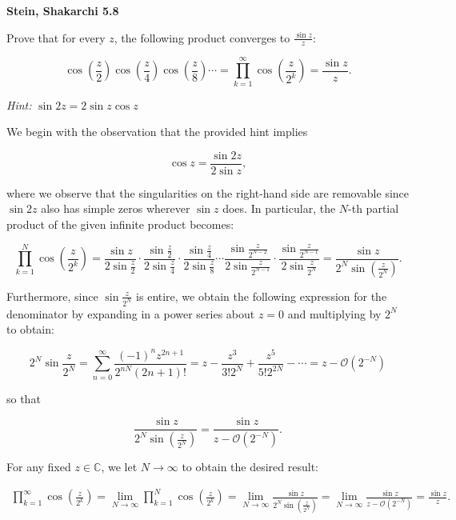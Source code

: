 \textbf{Stein, Shakarchi 5.8}

Prove that for every $z$, the following product converges to $\frac{\sin{z}}{z}$:

$$
\cos{\left(\frac{z}{2}\right)} \cos{\left(\frac{z}{4}\right)} \cos{\left(\frac{z}{8}\right)} \cdots 
  = \prod_{k=1}^{\infty} \cos{\left(\frac{z}{2^k}\right)}
  = \frac{\sin{z}}{z}.
$$

\textit{Hint: } $\sin{2z} = 2 \sin{z} \cos{z}$

\begin{solution}
  We begin with the observation that the provided hint implies

  $$
  \cos{z} = \frac{\sin{2z}}{2 \sin{z}},
  $$

  where we observe that the singularities on the right-hand side are removable since $\sin{2 z}$ also has simple zeros 
  wherever $\sin{z}$ does. In particular, the $N$-th partial product of the given infinite product becomes:

  $$
  \prod_{k=1}^{N} \cos{\left(\frac{z}{2^k}\right)} 
    = \frac{\sin{z}}{2 \sin{\frac{z}{2}}} 
      \cdot \frac{\sin{\frac{z}{2}}}{2 \sin{\frac{z}{4}}} 
      \cdot \frac{\sin{\frac{z}{4}}}{2 \sin{\frac{z}{8}}} 
      \cdots \frac{\sin{\frac{z}{2^{N-2}}}}{2 \sin{\frac{z}{2^{N-1}}}}
      \cdot \frac{\sin{\frac{z}{2^{N-1}}}}{2 \sin{\frac{z}{2^N}}}
    = \frac{\sin{z}}{2^N \sin{\left(\frac{z}{2^N}\right)}}.
  $$

  Furthermore, since $\sin{\frac{z}{2^N}}$ is entire, we obtain the following expression for the denominator by 
  expanding in a power series about $z = 0$ and multiplying by $2^N$ to obtain:

  $$
  2^N \sin{\frac{z}{2^N}} = \sum_{n=0}^{\infty} \frac{(-1)^n z^{2n+1}}{2^{nN} (2n+1)!}
                          = z - \frac{z^3}{3! 2^{N}} + \frac{z^5}{5! 2^{2N}} - \cdots
                          = z - \mathcal{O}\left(2^{-N}\right)
  $$

  so that 

  $$
    \frac{\sin{z}}{2^N \sin{\left(\frac{z}{2^N}\right)}} 
      = \frac{\sin{z}}{z - \mathcal{O} \left(2^{-N}\right)}.
  $$

  For any fixed $z \in \mathbb{C}$, we let $N \to \infty$ to obtain the desired result: 

  \begin{align*}
    \prod_{k=1}^{\infty} \cos{\left(\frac{z}{2^k}\right)}
      = \lim\limits_{N \to \infty} \prod_{k=1}^{N} \cos{\left(\frac{z}{2^k}\right)}
      = \lim\limits_{N \to \infty} \frac{\sin{z}}{2^N \sin{\left(\frac{z}{2^N}\right)}} 
      = \lim\limits_{N \to \infty} \frac{\sin{z}}{z - \mathcal{O} \left(2^{-N}\right)}
      = \frac{\sin{z}}{z}.
  \end{align*}
  \ \\
\end{solution}
